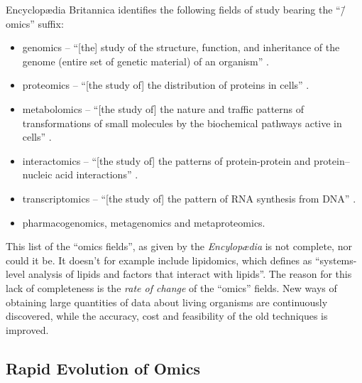 Encyclopædia Britannica \parencite[Bioinformatics]{Lesk2016} identifies the following fields of study bearing the ``\=/omics'' suffix:
\begin{itemize}
\item genomics -- ``[the] study of the structure, function, and inheritance of the genome (entire set of genetic material) of an organism'' \parencite[Genomics]{Griffiths2016}.
\item proteomics -- ``[the study of] the distribution of proteins in cells'' \parencite[Bioinformatics]{Lesk2016}.
\item metabolomics -- ``[the study of] the nature and traffic patterns of transformations of small molecules by the biochemical pathways active in cells'' \parencite[Bioinformatics]{Lesk2016}.
\item interactomics -- ``[the study of] the patterns of protein-protein and protein–nucleic acid interactions'' \parencite[Bioinformatics]{Lesk2016}.
\item transcriptomics -- ``[the study of] the pattern of RNA synthesis from DNA'' \parencite[Bioinformatics]{Lesk2016}.
\item pharmacogenomics, metagenomics and metaproteomics.
\end{itemize}

This list of the ``omics fields'', as given by the \textit{Encylopædia} is not complete, nor could it be. It doesn't for example include lipidomics, which \textcite{Wenk2005} defines as ``systems-level analysis of lipids and factors that interact with lipids''. The reason for this lack of completeness is the \textit{rate of change} of the ``omics'' fields. New ways of obtaining large quantities of data about living organisms are continuously discovered, while the accuracy, cost and feasibility of the old techniques is improved.

\subsection{Rapid Evolution of Omics}

